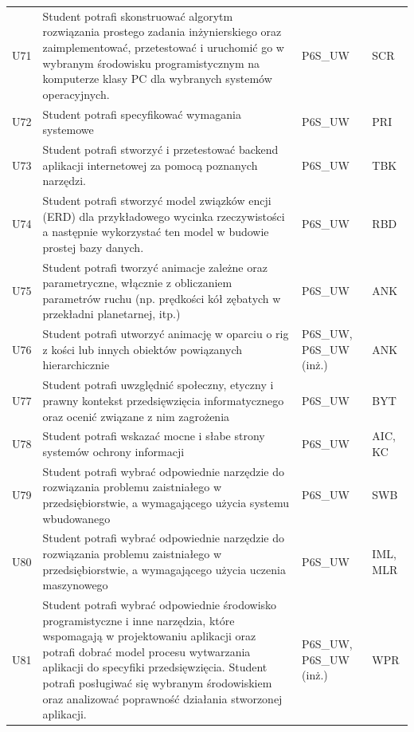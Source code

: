 \documentclass[12pt,a4paper]{article}
\begin{document}
{\begin{longtable}{m{1cm}m{8.8cm}m{2.1cm}m{2.5cm}}
\rowcolor{tableRowLight} U71 & Student potrafi skonstruować algorytm rozwiązania prostego zadania inżynierskiego oraz zaimplementować, przetestować i uruchomić go w wybranym środowisku programistycznym na komputerze klasy PC dla wybranych systemów operacyjnych. & {\scriptsize P6S\_UW} & {\scriptsize SCR} \\
\rowcolor{tableRowAlt} U72 & Student potrafi specyfikować wymagania systemowe & {\scriptsize P6S\_UW} & {\scriptsize PRI} \\
\rowcolor{tableRowLight} U73 & Student potrafi stworzyć i przetestować backend aplikacji internetowej za pomocą poznanych narzędzi. & {\scriptsize P6S\_UW} & {\scriptsize TBK} \\
\rowcolor{tableRowAlt} U74 & Student potrafi stworzyć model związków encji (ERD) dla przykładowego wycinka rzeczywistości a następnie wykorzystać ten model w budowie prostej bazy danych. & {\scriptsize P6S\_UW} & {\scriptsize RBD} \\
\rowcolor{tableRowLight} U75 & Student potrafi tworzyć animacje zależne oraz parametryczne, włącznie z obliczaniem parametrów ruchu (np. prędkości kół zębatych w przekładni planetarnej, itp.) & {\scriptsize P6S\_UW} & {\scriptsize ANK} \\
\rowcolor{tableRowAlt} U76 & Student potrafi utworzyć animację w oparciu o rig z kości lub innych obiektów powiązanych hierarchicznie & {\scriptsize P6S\_UW, P6S\_UW {\scriptsize (inż.)}} & {\scriptsize ANK} \\
\rowcolor{tableRowLight} U77 & Student potrafi uwzględnić społeczny, etyczny i prawny kontekst przedsięwzięcia informatycznego oraz ocenić związane z nim zagrożenia & {\scriptsize P6S\_UW} & {\scriptsize BYT} \\
\rowcolor{tableRowAlt} U78 & Student potrafi wskazać mocne i słabe strony systemów ochrony informacji & {\scriptsize P6S\_UW} & {\scriptsize AIC, KC} \\
\rowcolor{tableRowLight} U79 & Student potrafi wybrać odpowiednie narzędzie do rozwiązania problemu zaistniałego w przedsiębiorstwie, a wymagającego użycia systemu wbudowanego & {\scriptsize P6S\_UW} & {\scriptsize SWB} \\
\rowcolor{tableRowAlt} U80 & Student potrafi wybrać odpowiednie narzędzie do rozwiązania problemu zaistniałego w przedsiębiorstwie, a wymagającego użycia uczenia maszynowego & {\scriptsize P6S\_UW} & {\scriptsize IML, MLR} \\
\rowcolor{tableRowLight} U81 & Student potrafi wybrać odpowiednie środowisko programistyczne i inne narzędzia, które wspomagają w projektowaniu aplikacji oraz potrafi dobrać model procesu wytwarzania aplikacji do specyfiki przedsięwzięcia. Student potrafi posługiwać się wybranym środowiskiem oraz analizować poprawność działania stworzonej aplikacji. & {\scriptsize P6S\_UW, P6S\_UW {\scriptsize (inż.)}} & {\scriptsize WPR} \\

\end{longtable}}
\end{document}
